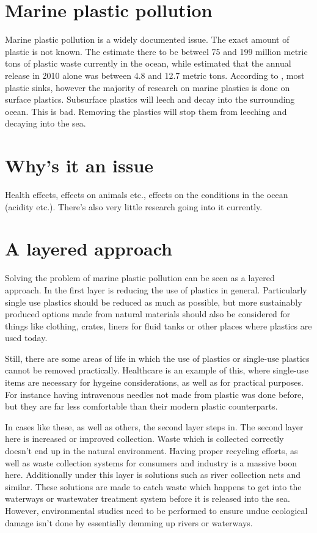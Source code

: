 \documentclass[class=article, crop=false]{standalone}
\begin{document}
\section{Marine plastic pollution}
Marine plastic pollution is a widely documented issue. The exact amount of plastic is not known. The \citet{world_economic_forum_top_2022} estimate there to be betweel 75 and 199 million metric tons of plastic waste currently in the ocean, while \citet{jambeck_plastic_2015} estimated that the annual release in 2010 alone was between 4.8 and 12.7 metric tons. According to \citet{isobe_fate_2022}, most plastic sinks, however the majority of research on marine plastics is done on surface plastics. Subsurface plastics will leech and decay into the surrounding ocean. This is bad. Removing the plastics will stop them from leeching and decaying into the sea.


\section{Why's it an issue}
Health effects, effects on animals etc., effects on the conditions in the ocean (acidity etc.). There's also very little research going into it currently.

\section{A layered approach}
Solving the problem of marine plastic pollution can be seen as a layered approach. In the first layer is reducing the use of plastics in general. Particularly single use plastics should be reduced as much as possible, but more sustainably produced options made from natural materials should also be considered for things like clothing, crates, liners for fluid tanks or other places where plastics are used today.

Still, there are some areas of life in which the use of plastics or single-use plastics cannot be removed practically. Healthcare is an example of this, where single-use items are necessary for hygeine considerations, as well as for practical purposes. For instance having intravenous needles not made from plastic was done before, but they are far less comfortable than their modern plastic counterparts.

In cases like these, as well as others, the second layer steps in. The second layer here is increased or improved collection. Waste which is collected correctly doesn't end up in the natural environment. Having proper recycling efforts, as well as waste collection systems for consumers and industry is a massive boon here. Additionally under this layer is solutions such as river collection nets and similar. These solutions are made to catch waste which happens to get into the waterways or wastewater treatment system before it is released into the sea. However, environmental studies need to be performed to ensure undue ecological damage isn't done by essentially demming up rivers or waterways.
\end{document}
